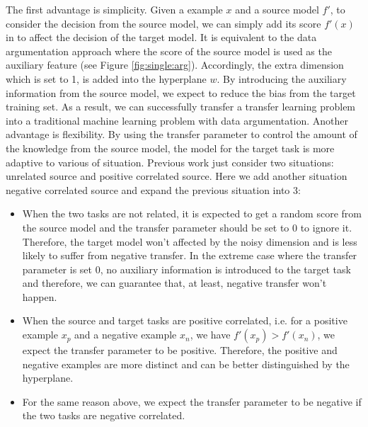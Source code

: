 The first advantage is simplicity. Given a example $x$ and a source model $f'$, to consider the decision from the source model, we can simply add its score $f'(x)$ in to affect the decision of the target model. It is equivalent to the data argumentation approach where the score of the source model is used as the auxiliary feature (see Figure \ref{fig:single:arg}). Accordingly, the extra dimension which is set to 1, is added into the hyperplane $w$. By introducing the auxiliary information from the source model, we expect to reduce the bias from the target training set. As a result, we can successfully transfer a transfer learning problem into a traditional machine learning problem with data argumentation.  
Another advantage is flexibility. By using the transfer parameter to control the amount of the knowledge from the source model, the model for the target task is more adaptive to various of situation. Previous work  \cite{kuzborskij2013n} \cite{tommasi2014learning} just consider two situations: unrelated source and positive correlated source. Here we add another situation negative correlated source and expand the previous situation into 3:
\begin{itemize}
	\item When the two tasks are not related, it is expected to get a random score from the source model and the transfer parameter should be set to 0 to ignore it. Therefore, the target model won't affected by the noisy dimension and is less likely to suffer from negative transfer. In the extreme case where the transfer parameter is set 0, no auxiliary information is introduced to the target task and therefore, we can guarantee that, at least, negative transfer won't happen.
	\item When the source and target tasks are positive correlated, i.e. for a positive example $x_p$ and a negative example $x_n$, we have $f'(x_p)>f'(x_n)$, we expect the transfer parameter to be positive. Therefore, the positive and negative examples are more distinct and can be better distinguished by the hyperplane.
	\item  For the same reason above, we expect the transfer parameter to be negative if the two tasks are negative correlated.
\end{itemize}

